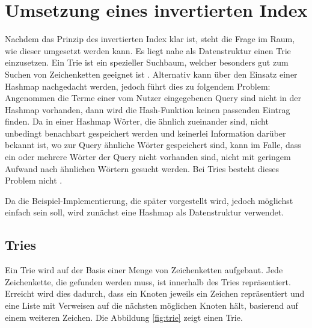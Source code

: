 \section{Umsetzung eines invertierten Index}
Nachdem das Prinzip des invertierten Index klar ist, steht die Frage im Raum, wie dieser umgesetzt werden kann.
Es liegt nahe als Datenstruktur einen Trie einzusetzen. Ein Trie ist ein spezieller Suchbaum, welcher besonders gut zum Suchen von Zeichenketten geeignet ist \cite[S. 50 f.]{IR_Intro_Cambridge}.
\newline
Alternativ kann über den Einsatz einer Hashmap nachgedacht werden, jedoch führt dies zu folgendem Problem:
Angenommen die Terme einer vom Nutzer eingegebenen Query sind nicht in der Hashmap vorhanden, dann wird die Hash-Funktion keinen passenden Eintrag finden. Da in einer Hashmap Wörter, die ähnlich zueinander sind, nicht unbedingt benachbart gespeichert werden und keinerlei Information darüber bekannt ist, wo zur Query ähnliche Wörter gespeichert sind, kann im Falle, dass ein oder mehrere Wörter der Query nicht vorhanden sind, nicht mit geringem Aufwand nach ähnlichen Wörtern gesucht werden. Bei Tries besteht dieses Problem nicht \cite[S. 50]{IR_Intro_Cambridge}. 
\newline

Da die Beispiel-Implementierung, die später vorgestellt wird, jedoch möglichst einfach sein soll, wird zunächst eine Hashmap als Datenstruktur verwendet. 

\subsection{Tries}
Ein Trie wird auf der Basis einer Menge von Zeichenketten aufgebaut. Jede Zeichenkette, die gefunden werden muss, ist innerhalb des Tries repräsentiert.
\newline
Erreicht wird dies dadurch, dass ein Knoten jeweils ein Zeichen repräsentiert und eine Liste mit Verweisen auf die nächsten möglichen Knoten hält, basierend auf einem weiteren Zeichen.
Die Abbildung \ref{fig:trie} zeigt einen Trie.

